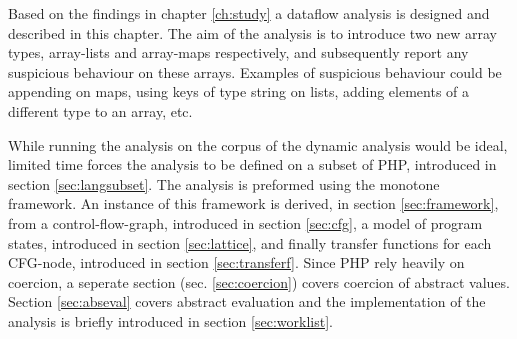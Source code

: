 Based on the findings in chapter \ref{ch:study} a dataflow analysis is designed and described in this chapter. The aim of the analysis is to introduce two new array types, array-lists and array-maps respectively, and subsequently report any suspicious behaviour on these arrays. Examples of suspicious behaviour could be appending on maps, using keys of type string on lists, adding elements of a different type to an array, etc. 

While running the analysis on the corpus of the dynamic analysis would be ideal, limited time forces the analysis to be defined on a subset of PHP, introduced in section \ref{sec:langsubset}. The analysis is preformed using the monotone framework. An instance of this framework is derived, in section \ref{sec:framework}, from a control-flow-graph, introduced in section \ref{sec:cfg}, a model of program states, introduced in section \ref{sec:lattice}, and finally transfer functions for each CFG-node, introduced in section \ref{sec:transferf}. Since PHP rely heavily on coercion, a seperate section (sec. \ref{sec:coercion}) covers coercion of abstract values. Section \ref{sec:abseval} covers abstract evaluation and the implementation of the analysis is briefly introduced in section \ref{sec:worklist}.
